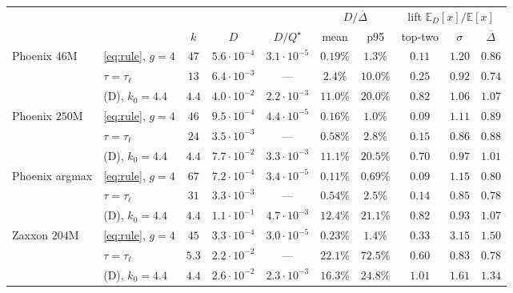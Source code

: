 \documentclass{article}
\newcommand{\E}{\mathbb{E}}
\newcommand{\gapbar}{\overline{\Delta}}
\newcommand{\srank}{\sigma}
\begin{document}
\begin{center}
\small
\setlength{\tabcolsep}{4.5pt}
\begin{tabular}{llcccccccc}
  \toprule
  & & & & & \multicolumn{2}{c}{$D/\gapbar$} & \multicolumn{3}{c}{lift $\E_D[x]/\E[x]$} \\
  \cmidrule(lr){6-7}\cmidrule(lr){8-10}
  & & $k$ & $D$ & $D/Q^\star$ & mean & p95 & top-two & $\srank$ & $\gapbar$ \\
  \midrule
  Phoenix $46$M  & \eqref{eq:rule}, $g=4$ & $47$  & $5.6{\cdot}10^{-4}$ & $3.1{\cdot}10^{-5}$ & $0.19\%$ & $1.3\%$  & $\bm{0.11}$ & $1.20$ & $0.86$ \\
                 & $\tau = \tau_\ell$     & $13$  & $6.4{\cdot}10^{-3}$ & ---                 & $2.4\%$  & $10.0\%$ & $0.25$ & $0.92$ & $0.74$ \\
                 & (D), $k_0 = 4.4$       & $4.4$ & $4.0{\cdot}10^{-2}$ & $2.2{\cdot}10^{-3}$ & $\bm{11.0\%}$ & $20.0\%$ & $0.82$ & $1.06$ & $\bm{1.07}$ \\
  \midrule
  Phoenix $250$M & \eqref{eq:rule}, $g=4$ & $46$  & $9.5{\cdot}10^{-4}$ & $4.4{\cdot}10^{-5}$ & $0.16\%$ & $1.0\%$  & $\bm{0.09}$ & $1.11$ & $0.89$ \\
                 & $\tau = \tau_\ell$     & $24$  & $3.5{\cdot}10^{-3}$ & ---                 & $0.58\%$ & $2.8\%$  & $0.15$ & $0.86$ & $0.88$ \\
                 & (D), $k_0 = 4.4$       & $4.4$ & $7.7{\cdot}10^{-2}$ & $3.3{\cdot}10^{-3}$ & $\bm{11.1\%}$ & $20.5\%$ & $0.70$ & $0.97$ & $\bm{1.01}$ \\
  \midrule
  Phoenix argmax & \eqref{eq:rule}, $g=4$ & $67$  & $7.2{\cdot}10^{-4}$ & $3.4{\cdot}10^{-5}$ & $0.11\%$ & $0.69\%$ & $\bm{0.09}$ & $1.15$ & $0.80$ \\
                 & $\tau = \tau_\ell$     & $31$  & $3.3{\cdot}10^{-3}$ & ---                 & $0.54\%$ & $2.5\%$  & $0.14$ & $0.85$ & $0.78$ \\
                 & (D), $k_0 = 4.4$       & $4.4$ & $1.1{\cdot}10^{-1}$ & $4.7{\cdot}10^{-3}$ & $\bm{12.4\%}$ & $21.1\%$ & $0.82$ & $0.93$ & $\bm{1.07}$ \\
  \midrule
  Zaxxon $204$M  & \eqref{eq:rule}, $g=4$ & $45$  & $3.3{\cdot}10^{-4}$ & $3.0{\cdot}10^{-5}$ & $0.23\%$ & $1.4\%$  & $\bm{0.33}$ & $3.15$ & $1.50$ \\
                 & $\tau = \tau_\ell$     & $5.3$ & $2.2{\cdot}10^{-2}$ & ---                 & $22.1\%$ & $72.5\%$ & $0.60$ & $0.83$ & $0.78$ \\
                 & (D), $k_0 = 4.4$       & $4.4$ & $2.6{\cdot}10^{-2}$ & $2.3{\cdot}10^{-3}$ & $\bm{16.3\%}$ & $24.8\%$ & $1.01$ & $1.61$ & $\bm{1.34}$ \\
  \bottomrule
\end{tabular}
\end{center}
\end{document}

